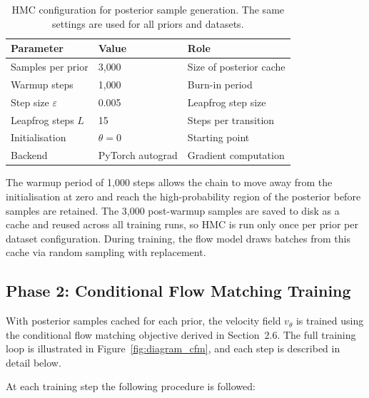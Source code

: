 \begin{table}[h]
\centering
\caption{HMC configuration for posterior 
sample generation. The same settings are 
used for all priors and datasets.}
\label{tab:hmc_config}
{\singlespacing
\begin{tabular}{lll}
\hline
Parameter & Value & Role \\
\hline
Samples per prior & 3{,}000 
& Size of posterior cache \\
Warmup steps & 1{,}000 
& Burn-in period \\
Step size $\varepsilon$ & 0.005 
& Leapfrog step size \\
Leapfrog steps $L$ & 15 
& Steps per transition \\
Initialisation & $\theta = 0$ 
& Starting point \\
Backend & PyTorch autograd 
& Gradient computation \\
\hline
\end{tabular}}
\end{table}

The warmup period of 1{,}000 steps 
allows the chain to move away from 
the initialisation at zero and reach 
the high-probability region of the 
posterior before samples are retained. 
The 3{,}000 post-warmup samples are 
saved to disk as a cache and reused 
across all training runs, so HMC is 
run only once per prior per dataset 
configuration. During training, the 
flow model draws batches from this 
cache via random sampling with 
replacement.

\subsection{Phase 2: Conditional Flow 
Matching Training}

With posterior samples cached for each 
prior, the velocity field $v_\theta$ is 
trained using the conditional flow 
matching objective derived in 
Section~2.6. The full training loop is 
illustrated in 
Figure~\ref{fig:diagram_cfm}, and each 
step is described in detail below.



At each training step the following 
procedure is followed:

